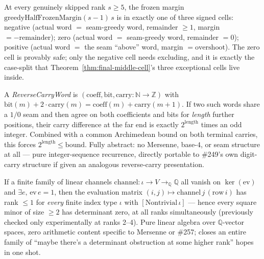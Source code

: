 \begin{lem}
\label{lem:skipped-endpoint-trichotomy}
At every genuinely skipped rank $s\ge 5$, the frozen margin
$\mathrm{greedyHalfFrozenMargin}(s{-}1)\,s$ is in exactly one of three signed cells:
negative (actual word $=$ seam-greedy word, remainder $\ge 1$, margin $=
-\mathrm{remainder}$); zero (actual word $=$ seam-greedy word, remainder $=0$); positive
(actual word $=$ the seam ``above'' word, margin $=\mathrm{overshoot}$). The zero cell is
provably safe; only the negative cell needs excluding, and it is exactly the case-split
that Theorem~\ref{thm:final-middle-cell}'s three exceptional cells live inside.
\par{}
\end{lem}

\begin{lem}
\label{lem:reverse-carry-word}
A \emph{ReverseCarryWord} is $(\mathrm{coeff},\mathrm{bit},\mathrm{carry}:\mathbb
N\to\mathbb Z)$ with $\mathrm{bit}(m)+2\cdot\mathrm{carry}(m) =
\mathrm{coeff}(m)+\mathrm{carry}(m{+}1)$. If two such words share a $1/0$ seam and then
agree on both coefficients and bits for \emph{length} further positions, their carry
difference at the far end is exactly $2^{\mathrm{length}}$ times an odd integer.
Combined with a common Archimedean bound on both terminal carries, this forces
$2^{\mathrm{length}}\le\mathrm{bound}$. Fully abstract: no Mersenne, base-$4$, or seam
structure at all — pure integer-sequence recurrence, directly portable to \#249's own
digit-carry structure if given an analogous reverse-carry presentation.
\par{}
\end{lem}

\begin{lem}
\label{lem:linear-channel-nogo}
If a finite family of linear channels $\mathrm{channel}:\iota\to V\to_{\mathbb Q}
\mathbb Q$ all vanish on $\ker(\mathrm{ev})$ and $\exists e,\,\mathrm{ev}\,e=1$, then the
evaluation matrix $(i,j)\mapsto\mathrm{channel}\,j\,(\mathrm{row}\,i)$ has rank $\le 1$ for
\emph{every} finite index type $\iota$ with $[\mathrm{Nontrivial}\,\iota]$ — hence every
square minor of size $\ge 2$ has determinant zero, at all ranks simultaneously (previously
checked only experimentally at ranks 2--4). Pure linear algebra over $\mathbb
Q$-vector spaces, zero arithmetic content specific to Mersenne or \#257; closes an entire
family of ``maybe there's a determinant obstruction at some higher rank'' hopes in one
shot.
\par{}
\end{lem}

